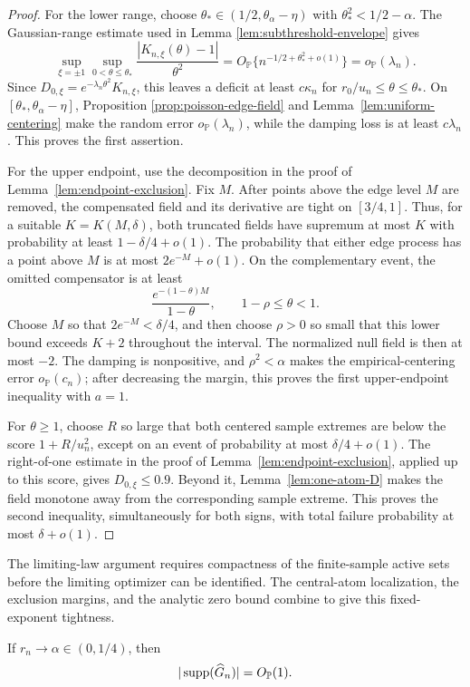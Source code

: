 \begin{proof}
For the lower range, choose
\(\theta_*\in(1/2,\theta_\alpha-\eta)\) with
\(\theta_*^2<1/2-\alpha\). The Gaussian-range estimate used in Lemma
\ref{lem:subthreshold-envelope} gives
\[
 \sup_{\xi=\pm1}\sup_{0<\theta\le\theta_*}
 \frac{|K_{n,\xi}(\theta)-1|}{\theta^2}
 =O_{\mathbb P}\{n^{-1/2+\theta_*^2+o(1)}\}
 =o_{\mathbb P}(\lambda_n).
\]
Since \(D_{0,\xi}=e^{-\lambda_n\theta^2}K_{n,\xi}\), this leaves a deficit
at least \(c\kappa_n\) for \(r_0/u_n\le\theta\le\theta_*\). On
\([\theta_*,\theta_\alpha-\eta]\), Proposition
\ref{prop:poisson-edge-field} and Lemma~\ref{lem:uniform-centering} make the
random error \(o_{\mathbb P}(\lambda_n)\), while the damping loss is at least
\(c\lambda_n\). This proves the first assertion.

For the upper endpoint, use the decomposition in the proof of
Lemma~\ref{lem:endpoint-exclusion}. Fix \(M\). After points above the edge
level \(M\) are removed, the compensated field and its derivative are tight
on \([3/4,1]\). Thus, for a suitable \(K=K(M,\delta)\), both truncated fields
have supremum at most \(K\) with probability at least \(1-\delta/4+o(1)\).
The probability that either edge process has a point above \(M\) is at most
\(2e^{-M}+o(1)\). On the complementary event, the omitted compensator is at
least
\[
    \frac{e^{-(1-\theta)M}}{1-\theta},
    \qquad 1-\rho\le\theta<1.
\]
Choose \(M\) so that \(2e^{-M}<\delta/4\), and then choose \(\rho>0\) so
small that this lower bound exceeds \(K+2\) throughout the interval. The
normalized null field is then at most \(-2\). The damping is nonpositive, and
\(\rho^2<\alpha\) makes the empirical-centering error \(o_{\mathbb P}(c_n)\);
after decreasing the margin, this proves the first upper-endpoint inequality
with \(a=1\).

For \(\theta\ge1\), choose \(R\) so large that both centered sample extremes
are below the score \(1+R/u_n^2\), except on an event of probability at most
\(\delta/4+o(1)\). The right-of-one estimate in the proof of
Lemma~\ref{lem:endpoint-exclusion}, applied up to this score, gives
\(D_{0,\xi}\le0.9\). Beyond it, Lemma~\ref{lem:one-atom-D} makes the field
monotone away from the corresponding sample extreme. This proves the second
inequality, simultaneously for both signs, with total failure probability
at most \(\delta+o(1)\).
\end{proof}

The limiting-law argument requires compactness of the finite-sample active
sets before the limiting optimizer can be identified. The central-atom
localization, the exclusion margins, and the analytic zero bound combine to
give this fixed-exponent tightness.
\begin{lemma}
\label{lem:fixed-exponent-support-tightness}
If \(r_n\to\alpha\in(0,1/4)\), then
\[
    |\operatorname{supp}(\widehat G_n)|=O_{\mathbb P}(1).
\]
\end{lemma}

